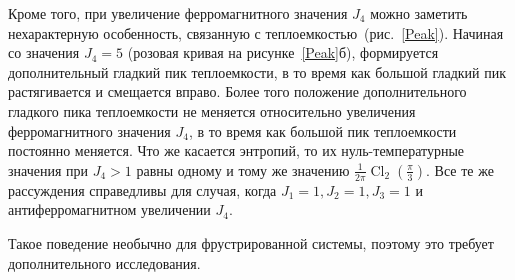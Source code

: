 \documentclass[utf8,12pt]{jetp}
\DeclareMathOperator{\Cl}{Cl}
\begin{document}
Кроме того, при увеличение ферромагнитного значения $J_4$ можно заметить нехарактерную особенность, связанную с теплоемкостью~(рис.~\ref{Peak}). Начиная со значения $J_4 = 5$ (розовая кривая на рисунке~\ref{Peak}б), формируется дополнительный гладкий пик теплоемкости, в то время как большой гладкий пик растягивается и смещается вправо. Более того положение дополнительного гладкого пика теплоемкости не меняется относительно увеличения ферромагнитного значения $J_4$, в то время как большой пик теплоемкости постоянно меняется. Что же касается энтропий, то их нуль-температурные значения при $J_4>1$ равны одному и тому же значению $\frac{1}{2\pi} \Cl_2 (\frac{\pi}{3})$. Все те же рассуждения справедливы для случая, когда $J_1 = 1, J_2 = 1, J_3 = 1$ и антиферромагнитном увеличении $J_4$.

Такое поведение необычно для фрустрированной системы, поэтому это требует дополнительного исследования.  
\end{document}
